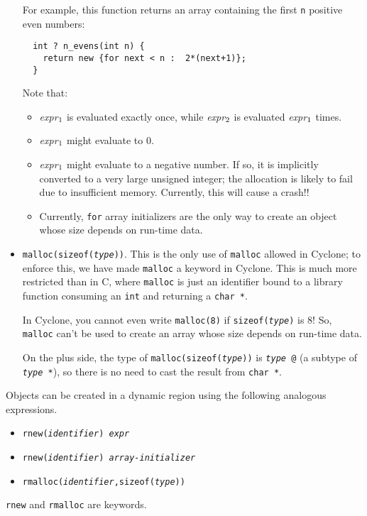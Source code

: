 \begin{itemize}
  For example, this function returns an array containing the first
  \texttt{n} positive even numbers:
\begin{verbatim}
  int ? n_evens(int n) {
    return new {for next < n :  2*(next+1)};
  }
\end{verbatim}

  Note that:
  \begin{itemize}
  \item {\it expr}\(\sb{1}\) is evaluated exactly once, while {\it
      expr}\(\sb{2}\) is evaluated {\it expr}\(\sb{1}\) times.
  \item {\it expr}\(\sb{1}\) might evaluate to 0.
  \item {\it expr}\(\sb{1}\) might evaluate to a negative number.
    If so, it is implicitly converted to a very large unsigned
    integer; the allocation is likely to fail due to insufficient
    memory.  Currently, this will cause a crash!!
  \item Currently, \texttt{for} array initializers are the only way to
    create an object whose size depends on run-time data.
  \end{itemize}
  
\item \texttt{malloc(sizeof({\it type}))}.  This is the only use of
  \texttt{malloc} allowed in Cyclone; to enforce this, we have made
  \texttt{malloc} a keyword in Cyclone.  This is much more restricted
  than in C, where \texttt{malloc} is just an identifier bound to a
  library function consuming an \texttt{int} and returning a
  \texttt{char *}.

  In Cyclone, you cannot even write \texttt{malloc(8)} if
  \texttt{sizeof({\it type})} is 8!  So, \texttt{malloc} can't be used
  to create an array whose size depends on run-time data.
  
  On the plus side, the type of \texttt{malloc(sizeof({\it type}))} is
  \texttt{{\it type} @} (a subtype of \texttt{{\it type} *}),
  so there is no need to cast the result from \texttt{char *}.
\end{itemize}

Objects can be created in a dynamic region using the following analogous
expressions.
\begin{itemize}
\item \texttt{rnew({\it identifier}) {\it expr}}
\item \texttt{rnew({\it identifier}) {\it array-initializer}}
\item \texttt{rmalloc({\it identifier},sizeof({\it type}))}
\end{itemize}
\texttt{rnew} and \texttt{rmalloc} are keywords.

